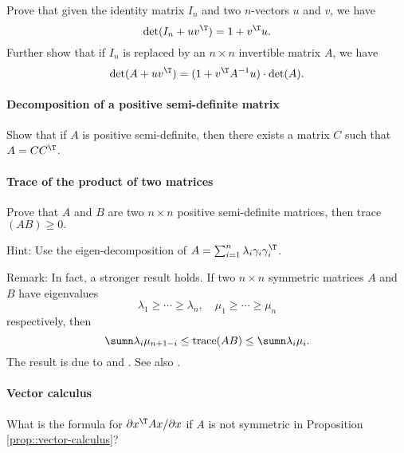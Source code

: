 Prove that  given the identity matrix $I_n$ and two $n$-vectors $u$ and $v$, we have
$$
\text{det}(I_n + uv^{\T}) = 1 + v^{\T} u. 
$$
Further show that if $I_n$ is replaced by an $n\times n$ invertible matrix $A$, we have
$$
\text{det}(A + uv^{\T}) = (1 +  v^{\T} A^{-1} u)  \cdot  \text{det}(A). 
$$



\paragraph{Decomposition of a positive semi-definite matrix}\label{hwmath::decompose-psd}

Show that if $A$ is positive semi-definite, then there exists a matrix $C$ such that $A = CC^{\T}$. 



\paragraph{Trace of the product of two matrices}
\label{hwmath1::trace-product}
Prove that $A$ and $B$ are two $n\times n$ positive semi-definite matrices, then trace$(AB) \geq 0.$

Hint: Use the eigen-decomposition of $A = \sum_{i=1}^n \lambda_i \gamma_i \gamma_i^{\T}$.

Remark: In fact, a stronger result holds. If two $n\times n$ symmetric matrices $A$ and $B$ have eigenvalues
$$
\lambda_1 \geq \cdots \geq \lambda_n, \quad
\mu_1 \geq \cdots \geq \mu_n
$$
respectively, then 
$$
\sumn \lambda_i \mu_{n+1-i} \leq 
\textup{trace}(AB) \leq 
\sumn \lambda_i \mu_i. 
$$
The result is
due to \citet{von1937some} and \citet{ruhe1970perturbation}. See also \citet[][Lemma 4.12]{chen2019model}.


\paragraph{Vector calculus}\label{hwmath1::vector-calculus-asymmetric}
What is the formula for $ \partial  x^{\T} A x / \partial  x$ if $A$ is not symmetric in Proposition 
\ref{prop::vector-calculus}?  

 

